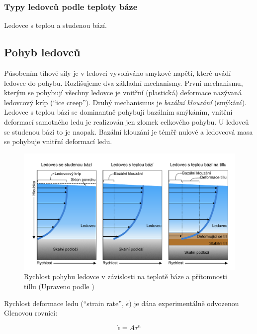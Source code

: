 \subsubsection{Typy ledovců podle teploty báze}
Ledovce s teplou a studenou bází.

\subsection{Pohyb ledovců}
Působením tíhové síly je v ledovci vyvoláváno smykové napětí, které uvádí ledovce do pohybu. Rozlišujeme dva základní mechanismy. První mechanismu, kterým se pohybují všechny ledovce je vnitřní (plastická) deformace nazývaná ledovcový kríp (\enquote{ice creep}). Druhý mechanismus je \emph{bazální klouzání} (smýkání). Ledovce s teplou bází se dominantně pohybují bazálním smýkáním, vnitřní deformací samotného ledu je realizován jen zlomek celkového pohybu. U ledovců se studenou bází to je naopak. Bazální klouzání je téměř nulové a ledovcová masa se pohybuje vnitřní deformací ledu. 

\begin{figure}
	\centering
	\includegraphics[width=1\linewidth]{obrazky/glac/flow_velocity}
	\caption{Rychlost pohybu ledovce v závislosti na teplotě báze a přítomnosti tillu (Upraveno podle \textcite{biermanKeyConceptsGeomorphology2014})}
	\label{fig:flowvelocity}
\end{figure}




Rychlost deformace ledu (\enquote{strain rate}, $\dot{\epsilon}$) je dána experimentálně odvozenou Glenovou rovnicí:

\begin{equation}
	\dot{\epsilon} = A\tau^{n}
\end{equation}


